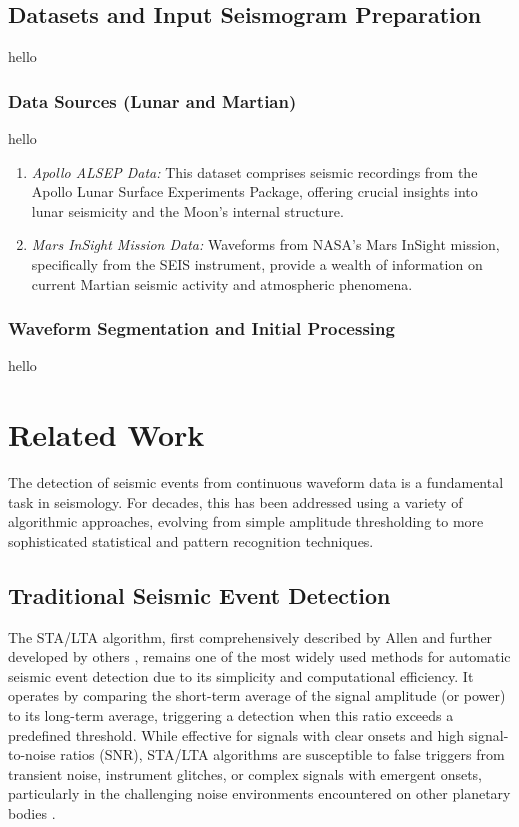 \documentclass[conference]{IEEEtran}
\begin{document}
        \subsection{Datasets and Input Seismogram Preparation}
            hello
            \subsubsection{Data Sources (Lunar and Martian)}
                hello
                \begin{enumerate}[label=\alph*), leftmargin=3em]
                    \item \textit{Apollo ALSEP Data:} This dataset comprises seismic recordings from the Apollo Lunar
                    Surface Experiments Package, offering crucial insights into lunar seismicity and the Moon's internal
                    structure.
                    \item \textit{Mars InSight Mission Data:} Waveforms from NASA's Mars InSight mission, specifically from
                    the SEIS instrument, provide a wealth of information on current Martian seismic activity and atmospheric
                    phenomena.
                \end{enumerate}
            \subsubsection{Waveform Segmentation and Initial Processing}
                hello
        
        \section{Related Work}
\label{sec:related_work}
The detection of seismic events from continuous waveform data is a fundamental task in seismology. For decades, this has been addressed using a variety of algorithmic approaches, evolving from simple amplitude thresholding to more sophisticated statistical and pattern recognition techniques.

\subsection{Traditional Seismic Event Detection}
The STA/LTA algorithm, first comprehensively described by Allen \cite{b14} and further developed by others \cite{b26}, remains one of the most widely used methods for automatic seismic event detection due to its simplicity and computational efficiency. It operates by comparing the short-term average of the signal amplitude (or power) to its long-term average, triggering a detection when this ratio exceeds a predefined threshold. While effective for signals with clear onsets and high signal-to-noise ratios (SNR), STA/LTA algorithms are susceptible to false triggers from transient noise, instrument glitches, or complex signals with emergent onsets, particularly in the challenging noise environments encountered on other planetary bodies \cite{b15}.
\end{document}
